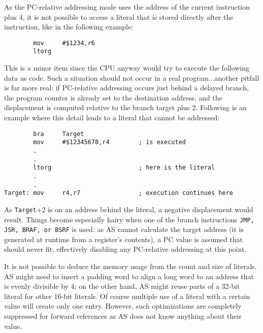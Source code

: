 \documentclass[12pt,twoside]{report}
\newcommand{\tty}[1]{{\tt #1}}
\newcommand{\asname}{{AS}}
\begin{document}
As the PC-relative addressing mode uses the address of the current
instruction plus 4, it is not possible to access a literal that is
stored directly after the instruction, like in the following example:
\begin{verbatim}
        mov     #$1234,r6
        ltorg
\end{verbatim}
This is a minor item since the CPU anyway would try to execute the
following data as code.  Such a situation should not occur in a real
program...another pitfall is far more real: if PC-relative addressing
occurs just behind a delayed branch, the program counter is already
set to the destination address, and the displacement is computed
relative to the branch target plus 2.  Following is an example where
this detail leads to a literal that cannot be addressed:
\begin{verbatim}
        bra     Target
        mov     #$12345678,r4        ; is executed
        .
        .
        ltorg                        ; here is the literal
        .
        .
Target: mov     r4,r7                ; execution continues here
\end{verbatim}
As \tty{Target}+2 is on an address behind the literal, a negative
displacement would result.  Things become especially hairy when one
of the branch instructions \tty{JMP, JSR, BRAF, or BSRF} is used: as \asname{}
cannot calculate the target address (it is generated at runtime from
a register's contents), a PC value is assumed that should never fit,
effectively disabling any PC-relative addressing at this point.

It is not possible to deduce the memory usage from the count and size
of literals.  \asname{} might need to insert a padding word to align a long
word to an address that is evenly divisible by 4; on the other hand,
\asname{} might reuse parts of a 32-bit literal for other 16-bit literals.
Of course multiple use of a literal with a certain value will create
only one entry.  However, such optimizations are completely
suppressed for forward references as \asname{} does not know anything about
their value.
\end{document}
